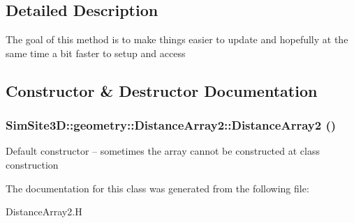 \subsection{Detailed Description}
The goal of this method is to make things easier to update and hopefully at the same time a bit faster to setup and access 



\subsection{Constructor \& Destructor Documentation}
\subsubsection{\setlength{\rightskip}{0pt plus 5cm}SimSite3D::geometry::Distance\-Array2::Distance\-Array2 ()\hspace{0.3cm}{\tt  [inline]}}\label{classSimSite3D_1_1geometry_1_1DistanceArray2_e951f6ba30f7b4868e4b00347f24da0e}


Default constructor -- sometimes the array cannot be constructed at class construction 

The documentation for this class was generated from the following file:\begin{CompactItemize}
\item 
Distance\-Array2.H\end{CompactItemize}

